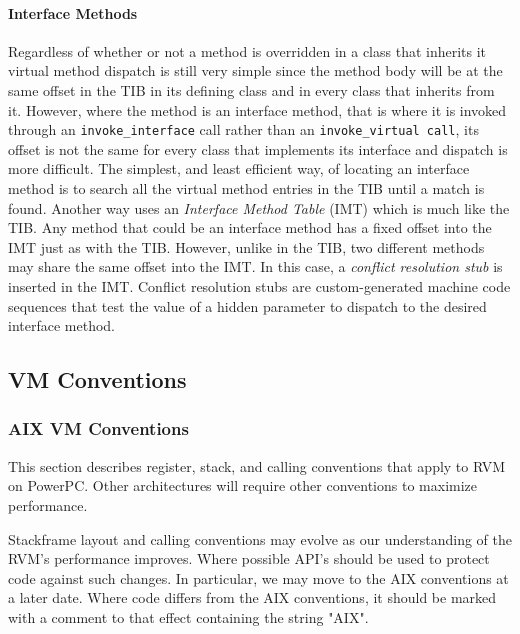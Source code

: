 \paragraph{Interface Methods}
Regardless of whether or not a method is overridden in a class that inherits it
virtual method dispatch is still very simple since the method body will be at
the same offset in the TIB in its defining class and in every class that 
inherits from it. 
However, where the method is an interface method, 
that is where it is invoked through an {\tt invoke\_interface} call rather than
an {\tt invoke\_virtual call}, its offset is not the same for every class that 
implements its interface and dispatch is more difficult.
The simplest, and least efficient way, of locating an interface method 
is to search all the virtual method entries in the TIB until a match is found.
Another way uses an {\em Interface Method Table} (IMT) which is much like the 
TIB. Any method that could be an interface method has a fixed offset into the 
IMT just as with the TIB. However, unlike in the TIB, two different methods may
share the same offset into the IMT. In this case, a {\em conflict resolution
stub} is inserted in the IMT. Conflict resolution stubs are
custom-generated machine code sequences that test the value of a
hidden parameter to dispatch to the desired interface method.


\subsection{VM Conventions}
\subsubsection{AIX VM Conventions} \label{aix-conventions}

This section describes register, stack, and calling conventions that apply to 
RVM on PowerPC.
Other architectures will require other conventions to maximize performance.

Stackframe layout and calling conventions may evolve as our understanding
of the RVM's performance improves.  Where possible API's should be used
to protect code against such changes.  In particular, we may move to
the AIX conventions at a later date.  Where code differs from the AIX
conventions, it should be marked with a comment to that effect containing
the string "AIX".

